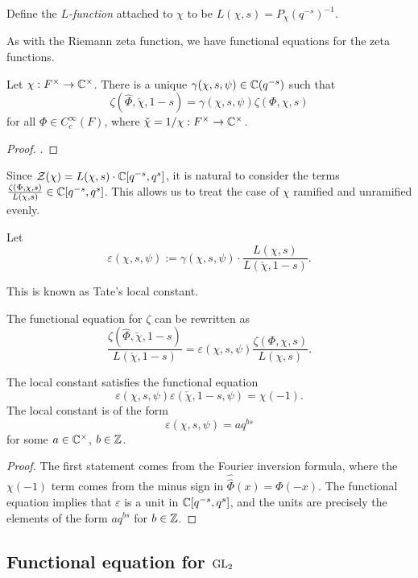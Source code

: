 \begin{defn}
    Define the \textit{$L$-function} attached to $\chi$ to be $L(\chi,s)=P_\chi(q^{-s})^{-1}$.
\end{defn}

As with the Riemann zeta function, we have functional equations for the zeta functions.

\begin{thm}\label{thm:gl1gamma}
    Let $\chi: F^\times \to \mathbb{C}^\times$. There is a unique $\gamma(\chi,s,\psi) \in \mathbb{C}(q^{-s})$ such that 
    $$\zeta(\hat{\Phi}, \check{\chi},1-s) = \gamma(\chi,s,\psi) \zeta(\Phi,\chi,s)$$ for all $\Phi \in C_c^\infty(F)$, where $\check{\chi}=1/\chi : F^\times \to \mathbb{C}^\times$.
\end{thm}
\begin{proof}
    \cite[Theorem 23.3]{BH1}.
\end{proof}

Since $\mathcal Z(\chi) = L(\chi,s)\cdot \mathbb{C}[q^{-s},q^s]$, it is natural to consider the terms $\frac{\zeta(\Phi,\chi,s)}{L(\chi,s)} \in \mathbb{C}[q^{-s},q^s]$. This allows us to treat the case of $\chi$ ramified and unramified evenly. 

\begin{defn}
    Let $$\varepsilon(\chi,s,\psi) := \gamma(\chi,s,\psi) \cdot \frac{L(\chi,s)}{L(\check{\chi},1-s)}.$$
\end{defn}
This is known as Tate's local constant.

The functional equation for $\zeta$ can be rewritten as
$$\frac{\zeta(\hat{\Phi},\check{\chi},1-s)}{L(\check{\chi},1-s)} = \varepsilon(\chi,s,\psi) \frac{\zeta(\Phi,\chi,s)}{L(\chi,s)}.$$

\begin{cor}
    The local constant satisfies the functional equation
    $$\varepsilon(\chi,s,\psi)\varepsilon(\check{\chi},1-s,\psi) = \chi(-1).$$
    The local constant is of the form $$\varepsilon(\chi,s,\psi) = aq^{bs}$$ for some $a \in \mathbb{C}^\times$, $b \in \mathbb{Z}$.
\end{cor}
\begin{proof}
    The first statement comes from the Fourier inversion formula, where the $\chi(-1)$ term comes from the minus sign in $\hat{\hat{\Phi}}(x) = \Phi(-x)$. The functional equation implies that $\varepsilon$ is a unit in $\mathbb{C}[q^{-s},q^s]$, and the units are precisely the elements of the form $aq^{bs}$ for $b \in \mathbb{Z}$.
\end{proof}


\subsection{Functional equation for \texorpdfstring{$\mathrm{GL}_2$}{TEXT}}


